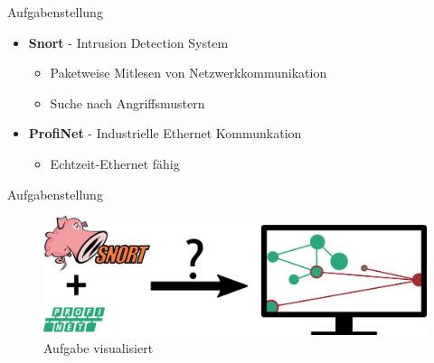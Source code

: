 \begin{frame}{Aufgabenstellung}
\begin{itemize}
  \item \textbf{Snort} - Intrusion Detection System
    \begin{itemize}
      \item Paketweise Mitlesen von Netzwerkkommunikation
      \item Suche nach Angriffsmustern
    \end{itemize}
  \item \textbf{ProfiNet} - Industrielle Ethernet Kommunkation
    \begin{itemize}
      \item Echtzeit-Ethernet fähig
    \end{itemize}
\end{itemize}
\end{frame}

\begin{frame}{Aufgabenstellung}
\begin{figure}
  \centering
  \includegraphics[width=\textwidth]{./images/aufgabestellung.jpg}
  \caption{Aufgabe visualisiert}
\end{figure}
\end{frame}